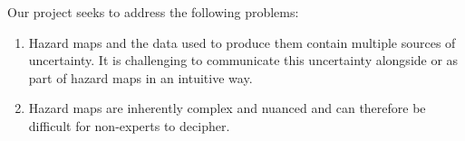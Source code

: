 



\begin{large}
	Our project seeks to address the following problems:
	\begin{enumerate}[leftmargin=2cm]
		\item Hazard maps and the data used to produce them contain multiple sources of uncertainty. It is challenging to communicate this uncertainty alongside or as part of hazard maps in an intuitive way.
		\item Hazard maps are inherently complex and nuanced and can therefore be difficult for non-experts to decipher.
	\end{enumerate}
\end{large}

